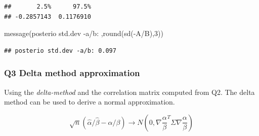\documentclass[
]{book}
\newenvironment{Shaded}{\begin{snugshade}}{\end{snugshade}}
\newcommand{\DecValTok}[1]{\textcolor[rgb]{0.00,0.00,0.81}{#1}}
\newcommand{\FunctionTok}[1]{\textcolor[rgb]{0.00,0.00,0.00}{#1}}
\newcommand{\NormalTok}[1]{#1}
\newcommand{\SpecialCharTok}[1]{\textcolor[rgb]{0.00,0.00,0.00}{#1}}
\newcommand{\StringTok}[1]{\textcolor[rgb]{0.31,0.60,0.02}{#1}}
\theoremstyle{definition}
\theoremstyle{definition}
\theoremstyle{definition}
\theoremstyle{definition}
\theoremstyle{remark}
\begin{document}
\begin{verbatim}
##       2.5%      97.5% 
## -0.2857143  0.1176910
\end{verbatim}

\begin{Shaded}
\begin{Highlighting}[]
 \FunctionTok{message}\NormalTok{(}\StringTok{\textquotesingle{}posterio std.dev {-}a/b: \textquotesingle{}}\NormalTok{,}\FunctionTok{round}\NormalTok{(}\FunctionTok{sd}\NormalTok{(}\SpecialCharTok{{-}}\NormalTok{A}\SpecialCharTok{/}\NormalTok{B),}\DecValTok{3}\NormalTok{))}
\end{Highlighting}
\end{Shaded}

\begin{verbatim}
## posterio std.dev -a/b: 0.097
\end{verbatim}

\hypertarget{q3-delta-method-approximation}{%
\subsubsection*{Q3 Delta method approximation}\label{q3-delta-method-approximation}}

Using the \emph{delta-method} and the correlation matrix computed from Q2. The delta method can be used to derive a normal approximation.

\begin{equation}
\sqrt{n}(\hat{\alpha}/\hat{\beta}-\alpha/\beta) \to N(0, \nabla \frac{\alpha}{\beta}^T \Sigma \nabla \frac{\alpha}{\beta})
\end{equation}
\end{document}
